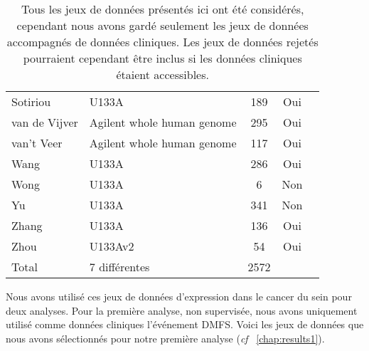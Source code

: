 \begin{table}
\begin{center}
\begin{tabular}{llccc}
						Sotiriou		& U133A								& 189	& Oui	\\
						van de Vijver	& Agilent whole human genome		& 295	& Oui	\\
						van't Veer		& Agilent whole human genome		& 117	& Oui	\\
						Wang			& U133A								& 286	& Oui	\\
						Wong			& U133A								& 6		& Non	\\
						Yu				& U133A								& 341	& Non	\\
						Zhang			& U133A								& 136	& Oui	\\
						Zhou			& U133Av2							& 54	& Oui	\\
						\midrule
						Total			& 7 différentes						& 2572	&		\\
						\bottomrule
					\end{tabular}
					\label{tab:MetDatasets}
					\vspace{5ex}
					\caption*{Tous les jeux de données présentés ici ont été considérés, cependant nous avons gardé seulement les jeux de données accompagnés de données cliniques. Les jeux de données rejetés pourraient cependant être inclus si les données cliniques étaient accessibles.}
				\end{center}
			\end{table}

			Nous avons utilisé ces jeux de données d'expression dans le cancer du sein pour deux analyses.
			Pour la première analyse, non supervisée, nous avons uniquement utilisé comme données cliniques l'événement DMFS.
			Voici les jeux de données que nous avons sélectionnés pour notre première analyse (\emph{cf} ~\ref{chap:results1}).

